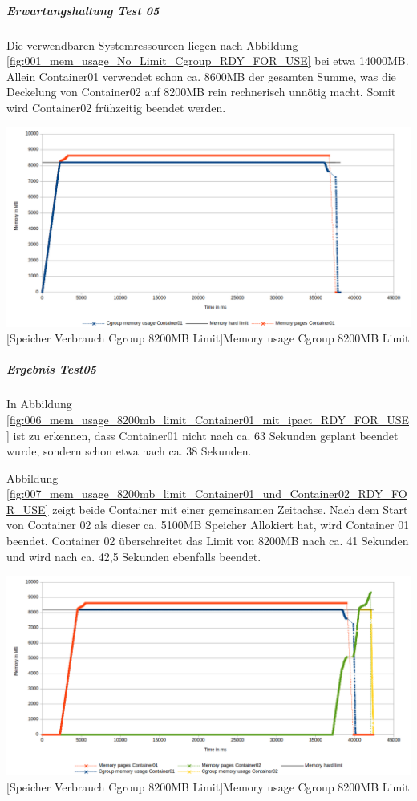 \subparagraph{Erwartungshaltung Test 05}
Die verwendbaren Systemressourcen liegen nach Abbildung \ref{fig:001_mem_usage_No_Limit_Cgroup_RDY_FOR_USE} bei etwa 14000MB. Allein Container01 verwendet schon ca. 8600MB der gesamten Summe, was die Deckelung von Container02 auf 8200MB rein rechnerisch unnötig macht. Somit wird Container02 frühzeitig beendet werden. 

\vspace{1em}
\begin{minipage}{\linewidth}
	\centering
	\includegraphics[width=1\linewidth]{pics/006_mem_usage_8200mb_limit_Container01_mit_ipact_RDY_FOR_USE.png}
	[Speicher Verbrauch Cgroup 8200MB Limit]{Memory usage Cgroup 8200MB Limit}
	\label{fig:006_mem_usage_8200mb_limit_Container01_mit_ipact_RDY_FOR_USE}
\end{minipage}

\subparagraph{Ergebnis Test05}
In Abbildung \ref{fig:006_mem_usage_8200mb_limit_Container01_mit_ipact_RDY_FOR_USE} ist zu erkennen, dass Container01 nicht nach ca. 63 Sekunden geplant beendet wurde, sondern schon etwa nach ca. 38 Sekunden.

Abbildung \ref{fig:007_mem_usage_8200mb_limit_Container01_und_Container02_RDY_FOR_USE} zeigt beide Container mit einer gemeinsamen Zeitachse. Nach dem Start von Container 02 als dieser ca. 5100MB Speicher Allokiert hat, wird Container 01 beendet. Container 02 überschreitet das Limit von 8200MB nach ca. 41 Sekunden und wird nach ca. 42,5 Sekunden ebenfalls beendet.

\vspace{1em}
\begin{minipage}{\linewidth}
	\centering
	\includegraphics[width=1\linewidth]{pics/007_mem_usage_8200mb_limit_Container01_und_Container02_RDY_FOR_USE.png}
	[Speicher Verbrauch Cgroup 8200MB Limit]{Memory usage Cgroup 8200MB Limit}
	\label{fig:007_mem_usage_8200mb_limit_Container01_und_Container02_RDY_FOR_USE}
\end{minipage}

